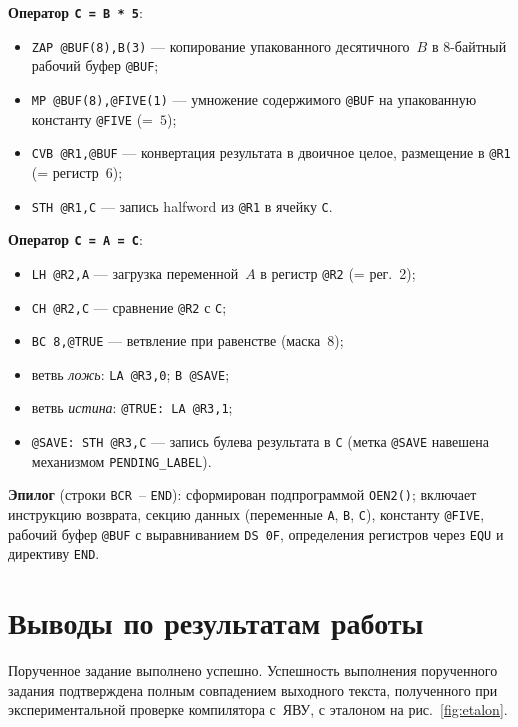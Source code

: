 \documentclass[a4paper,14pt]{extarticle}
\begin{document}
\textbf{Оператор \texttt{C = B * 5}}:
\begin{itemize}
  \item \texttt{ZAP @BUF(8),B(3)} — копирование упакованного десятичного~$B$ в
        8-байтный рабочий буфер \texttt{@BUF};
  \item \texttt{MP @BUF(8),@FIVE(1)} — умножение содержимого \texttt{@BUF} на
        упакованную константу \texttt{@FIVE} (=~$5$);
  \item \texttt{CVB @R1,@BUF} — конвертация результата в двоичное целое,
        размещение в \texttt{@R1} (= регистр~6);
  \item \texttt{STH @R1,C} — запись halfword из \texttt{@R1} в ячейку \texttt{C}.
\end{itemize}

\textbf{Оператор \texttt{C = A = C}}:
\begin{itemize}
  \item \texttt{LH @R2,A} — загрузка переменной~$A$ в регистр \texttt{@R2} (= рег.~2);
  \item \texttt{CH @R2,C} — сравнение \texttt{@R2} с \texttt{C};
  \item \texttt{BC 8,@TRUE} — ветвление при равенстве (маска~8);
  \item ветвь \textit{ложь}: \texttt{LA @R3,0}; \texttt{B @SAVE};
  \item ветвь \textit{истина}: \texttt{@TRUE: LA @R3,1};
  \item \texttt{@SAVE: STH @R3,C} — запись булева результата в \texttt{C}
        (метка \texttt{@SAVE} навешена механизмом \texttt{PENDING\_LABEL}).
\end{itemize}

\textbf{Эпилог} (строки \texttt{BCR}~– \texttt{END}): сформирован подпрограммой
\texttt{OEN2()}; включает инструкцию возврата, секцию данных (переменные
\texttt{A}, \texttt{B}, \texttt{C}), константу \texttt{@FIVE}, рабочий буфер
\texttt{@BUF} с выравниванием \texttt{DS 0F}, определения регистров через
\texttt{EQU} и директиву \texttt{END}.

\section{Выводы по результатам работы}

Порученное задание выполнено успешно. Успешность выполнения порученного задания
подтверждена полным совпадением выходного текста, полученного при
экспериментальной проверке компилятора с~ЯВУ, с эталоном на рис.~\ref{fig:etalon}.
\end{document}
